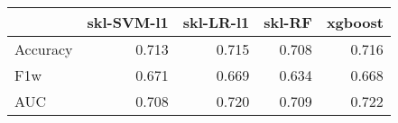 \begin{tabular}{lrrrr}
\toprule
{} &  skl-SVM-l1 &  skl-LR-l1 &  skl-RF &  xgboost \\
\midrule
Accuracy &       0.713 &      0.715 &   0.708 &    0.716 \\
F1w      &       0.671 &      0.669 &   0.634 &    0.668 \\
AUC      &       0.708 &      0.720 &   0.709 &    0.722 \\
\bottomrule
\end{tabular}
